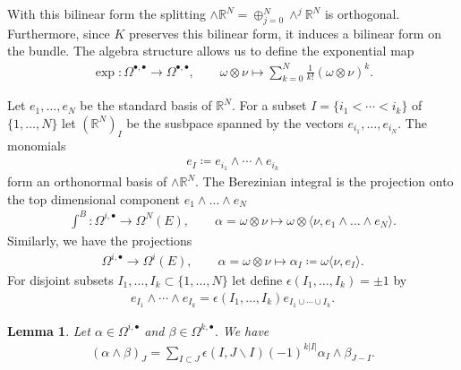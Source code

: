 \documentclass[a4paper,11pt]{amsart} %
\newcommand{\8}{\infty}
\newcommand{\R}{\mathbb{R}}
\theoremstyle{mytheoremstyle}
\newtheorem{lem}[thm]{Lemma}
\theoremstyle{remark}
\numberwithin{equation}{section}
\begin{document}
With this bilinear form the splitting $\wedge \R^{N}= \oplus_{j=0}^N \wedge^j \R^{N}$ is orthogonal. Furthermore, since $K$ preserves this bilinear form, it induces a bilinear form on the bundle. The algebra structure allows us to define the exponential map
\begin{align}
    \exp \colon \Omega^{\bullet,\bullet}  \longrightarrow \Omega^{\bullet,\bullet}, \qquad
    \omega \otimes \nu \longmapsto \sum_{k=0}^N \frac{1}{k!} (\omega \otimes \nu)^{k}. 
\end{align}

Let $e_1, \dots, e_N$ be the standard basis of $\R^{N}$. For a subset $I=\{i_1< \cdots<i_k\}$ of $\{1, \dots, N\}$ let $(\R^{N})_I$ be the susbpace spanned by the vectors $e_{i_1}, \dots, e_{i_N}$. The monomials
\begin{align}
    e_I \coloneqq e_{i_1} \wedge \cdots \wedge e_{i_k}
\end{align}
form an orthonormal basis of $\wedge \R^{N}$. The Berezinian integral is the projection onto the top dimensional component $e_1 \wedge \dots \wedge e_N$
\begin{align}
    \int^B \colon \Omega^{i,\bullet} \longrightarrow \Omega^N(E), \qquad
    \alpha = \omega \otimes \nu \longmapsto \omega \otimes \langle \nu,e_1 \wedge \dots \wedge e_N\rangle.
\end{align}
Similarly, we have the projections
\begin{align}
    \Omega^{i,\bullet} \longrightarrow \Omega^i(E), \qquad
    \alpha = \omega \otimes \nu \longmapsto \alpha_I \coloneqq \omega \langle \nu,e_I \rangle.
\end{align}
For disjoint subsets $I_1, \dots,I_k \subset \{ 1,\dots, N\}$ let define $\epsilon(I_1, \dots,I_k)= \pm 1$ by
\begin{align}
    e_{I_1} \wedge \cdots \wedge e_{I_k}=\epsilon(I_1, \dots,I_k) e_{I_1 \cup \cdots \cup I_k}.
\end{align}
\begin{lem} \label{splitlem} Let $\alpha \in \Omega^{i,\bullet}$ and $\beta \in \Omega^{k,\bullet}$. We have
\begin{align}
 (\alpha \wedge \beta)_J = \sum_{I \subset J}  \epsilon(I,J \smallsetminus I) (-1)^{k \vert I \vert } \alpha_I \wedge \beta_{J-I}.
\end{align}
\end{lem}
\end{document}
